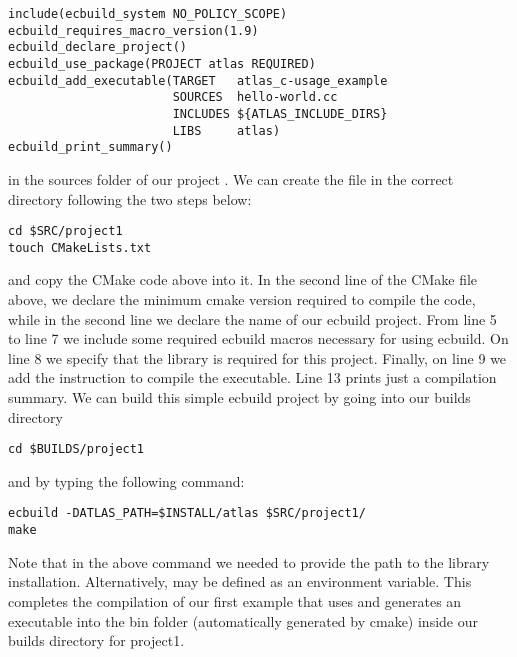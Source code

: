\begin{description}
\begin{lstlisting}[style=XMLStyle]
include(ecbuild_system NO_POLICY_SCOPE)
ecbuild_requires_macro_version(1.9)
ecbuild_declare_project()
ecbuild_use_package(PROJECT atlas REQUIRED)
ecbuild_add_executable(TARGET   atlas_c-usage_example
                       SOURCES  hello-world.cc 
                       INCLUDES ${ATLAS_INCLUDE_DIRS}
                       LIBS     atlas)
ecbuild_print_summary()
\end{lstlisting}
in the sources folder of our project .
We can create the  file in the correct 
directory following the two steps below:
%
\begin{lstlisting}[style=BashStyle]
cd $SRC/project1
touch CMakeLists.txt
\end{lstlisting}
%
and copy the CMake code above into it.
In the second line of the CMake file above, we declare the minimum 
cmake version required to compile the code, while in the second 
line we declare the name of our ecbuild project. 
From line 5 to line 7 we include some required ecbuild macros 
necessary for using ecbuild. On line 8 we specify that the 
\Atlas library is required for this project. Finally, on line 
9 we add the instruction to compile the executable.
Line 13 prints just a compilation summary.
We can build this simple ecbuild project by going into our builds 
directory 
%
\begin{lstlisting}[style=BashStyle]
cd $BUILDS/project1
\end{lstlisting}
%  
and by typing the following command:
%
\begin{lstlisting}[style=BashStyle]
ecbuild -DATLAS_PATH=$INSTALL/atlas $SRC/project1/
make 
\end{lstlisting}
%  
Note that in the above command we needed to provide the path 
to the \Atlas library installation. Alternatively,
 may be defined as an environment variable.
This completes the compilation of our first example that
uses \Atlas and generates an executable into the bin folder
(automatically generated by cmake) inside our builds directory
for project1.
\end{description}
%

